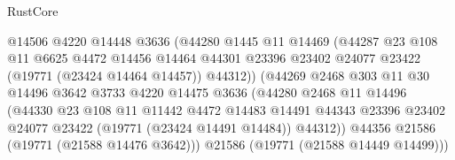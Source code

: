 \begin{lexlean}{RustCore}
\begin{coremodule}
                                  @14506
                                  @4220
                                  @14448
                                  @3636
                                  (@44280
                                    @1445
                                    @11
                                    @14469
                                    (@44287
                                      @23
                                      @108
                                      @11
                                      @6625
                                      @4472
                                      @14456
                                      @14464
                                      @44301
                                      @23396
                                      @23402
                                      @24077
                                      @23422
                                      (@19771 (@23424 @14464 @14457))
                                      @44312))
                                  (@44269
                                    @2468
                                    @303
                                    @11
                                    @30
                                    @14496
                                    @3642
                                    @3733
                                    @4220
                                    @14475
                                    @3636
                                    (@44280
                                      @2468
                                      @11
                                      @14496
                                      (@44330
                                        @23
                                        @108
                                        @11
                                        @11442
                                        @4472
                                        @14483
                                        @14491
                                        @44343
                                        @23396
                                        @23402
                                        @24077
                                        @23422
                                        (@19771 (@23424 @14491 @14484))
                                        @44312))
                                    @44356
                                    @21586
                                    (@19771 (@21588 @14476 @3642)))
                                  @21586
                                  (@19771 (@21588 @14449 @14499)))

\end{coremodule}
\end{lexlean}
